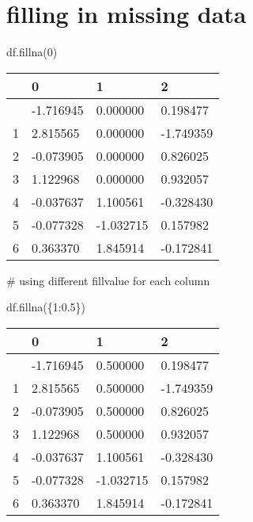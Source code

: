 \documentclass[
  letterpaper,
  DIV=11,
  numbers=noendperiod]{scrreprt}
\newenvironment{Shaded}{\begin{snugshade}}{\end{snugshade}}
\newcommand{\CommentTok}[1]{\textcolor[rgb]{0.37,0.37,0.37}{#1}}
\newcommand{\DecValTok}[1]{\textcolor[rgb]{0.68,0.00,0.00}{#1}}
\newcommand{\FloatTok}[1]{\textcolor[rgb]{0.68,0.00,0.00}{#1}}
\newcommand{\NormalTok}[1]{\textcolor[rgb]{0.00,0.23,0.31}{#1}}
\begin{document}
\hypertarget{filling-in-missing-data}{%
\section{filling in missing data}\label{filling-in-missing-data}}

\begin{Shaded}
\begin{Highlighting}[]
\NormalTok{df.fillna(}\DecValTok{0}\NormalTok{)}
\end{Highlighting}
\end{Shaded}

\begin{longtable}[]{@{}llll@{}}
\toprule\noalign{}
& 0 & 1 & 2 \\
\midrule\noalign{}
\endhead
\bottomrule\noalign{}
\endlastfoot
0 & -1.716945 & 0.000000 & 0.198477 \\
1 & 2.815565 & 0.000000 & -1.749359 \\
2 & -0.073905 & 0.000000 & 0.826025 \\
3 & 1.122968 & 0.000000 & 0.932057 \\
4 & -0.037637 & 1.100561 & -0.328430 \\
5 & -0.077328 & -1.032715 & 0.157982 \\
6 & 0.363370 & 1.845914 & -0.172841 \\
\end{longtable}

\begin{Shaded}
\begin{Highlighting}[]
\CommentTok{\# using different fillvalue for each column}

\NormalTok{df.fillna(\{}\DecValTok{1}\NormalTok{:}\FloatTok{0.5}\NormalTok{\})}
\end{Highlighting}
\end{Shaded}

\begin{longtable}[]{@{}llll@{}}
\toprule\noalign{}
& 0 & 1 & 2 \\
\midrule\noalign{}
\endhead
\bottomrule\noalign{}
\endlastfoot
0 & -1.716945 & 0.500000 & 0.198477 \\
1 & 2.815565 & 0.500000 & -1.749359 \\
2 & -0.073905 & 0.500000 & 0.826025 \\
3 & 1.122968 & 0.500000 & 0.932057 \\
4 & -0.037637 & 1.100561 & -0.328430 \\
5 & -0.077328 & -1.032715 & 0.157982 \\
6 & 0.363370 & 1.845914 & -0.172841 \\
\end{longtable}
\end{document}
